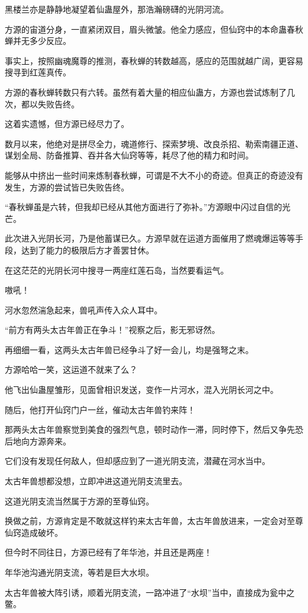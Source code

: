 \begin{this_body}
黑楼兰亦是静静地凝望着仙蛊屋外，那浩瀚磅礴的光阴河流。

方源的宙道分身，一直紧闭双目，眉头微皱。他全力感应，但仙窍中的本命蛊春秋蝉并无多少反应。

事实上，按照幽魂魔尊的推测，春秋蝉的转数越高，感应的范围就越广阔，更容易搜寻到红莲真传。

方源的春秋蝉转数只有六转。虽然有着大量的相应仙蛊方，方源也尝试炼制了几次，都以失败告终。

这着实遗憾，但方源已经尽力了。

数月以来，他绝对是拼尽全力，魂道修行、探索梦境、改良杀招、勒索南疆正道、谋划全局、防备推算、吞并各大仙窍等等，耗尽了他的精力和时间。

能够从中挤出一些时间来炼制春秋蝉，可谓是不大不小的奇迹。但真正的奇迹没有发生，方源的尝试皆已失败告终。

“春秋蝉虽是六转，但我却已经从其他方面进行了弥补。”方源眼中闪过自信的光芒。

此次进入光阴长河，乃是他蓄谋已久。方源早就在运道方面催用了燃魂爆运等等手段，达到了能力的极限后方才善罢甘休。

在这茫茫的光阴长河中搜寻一两座红莲石岛，当然要看运气。

嗷吼！

河水忽然湍急起来，兽吼声传入众人耳中。

“前方有两头太古年兽正在争斗！”视察之后，影无邪讶然。

再细细一看，这两头太古年兽已经争斗了好一会儿，均是强弩之末。

方源哈哈一笑，这运道不就来了么？

他飞出仙蛊屋雏形，见面曾相识发送，变作一片河水，混入光阴长河之中。

随后，他打开仙窍门户一丝，催动太古年兽钓来阵！

那两头太古年兽察觉到美食的强烈气息，顿时动作一滞，同时停下，然后又争先恐后地向方源奔来。

它们没有发现任何敌人，但却感应到了一道光阴支流，潜藏在河水当中。

太古年兽想都没想，立即冲进这道光阴支流里去。

这道光阴支流当然属于方源的至尊仙窍。

换做之前，方源肯定是不敢就这样钓来太古年兽，太古年兽放进来，一定会对至尊仙窍造成破坏。

但今时不同往日，方源已经有了年华池，并且还是两座！

年华池沟通光阴支流，等若是巨大水坝。

太古年兽被大阵引诱，顺着光阴支流，一路冲进了“水坝”当中，直接成为瓮中之鳖。


\end{this_body}
